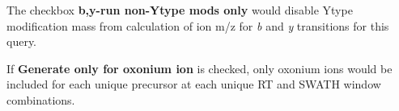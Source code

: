 \documentclass[../manual.tex]{subfiles}
\begin{document}
The checkbox \textbf{b,y-run non-Ytype mods only} would disable Ytype modification mass from calculation of ion m/z for \emph{b} and \emph{y} transitions for this query.\par

If \textbf{Generate only for oxonium ion} is checked, only oxonium ions would be included for each unique precursor at each unique RT and SWATH window combinations.\par
\end{document}
